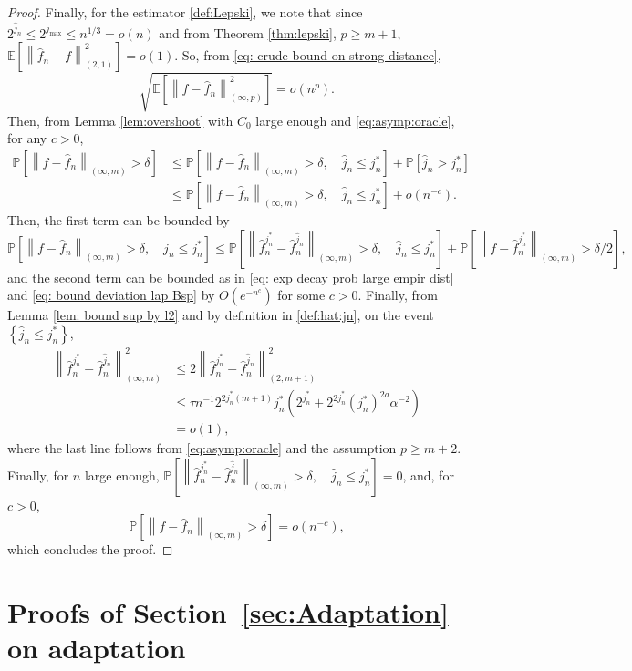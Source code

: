 \documentclass[preprint]{imsart}
\newcommand\norm[1]{\left\lVert#1\right\rVert}
\numberwithin{equation}{section}
\newcounter{cond}
\begin{document}
\begin{appendix}
\begin{proof}
Finally, for the estimator \eqref{def:Lepski}, we note that since $2^{\hat{j}_n}\leq 2^{j_{\max}}\leq n^{1/3}=o(n)$ and from Theorem \ref{thm:lepski}, $p\geq m+1$, $\mathbb{E}\left[\norm{\hat{f}_n-f}_{(2,1)}^2\right]=o(1)$. So, from \eqref{eq: crude bound on strong distance}, 
\[\sqrt{\mathbb{E}\left[\norm{f-\hat{f}_n}_{(\infty,p)}^2\right]}=o(n^{p}).\]
Then, from Lemma \eqref{lem:overshoot} with $C_0$ large enough and \eqref{eq:asymp:oracle}, for any $c>0$,
\begin{align*}
\mathbb{P}\left[\norm{f-\hat{f}_n}_{(\infty,m)}> \delta\right]&\leq \mathbb{P}\left[\norm{f-\hat{f}_n}_{(\infty,m)}> \delta,\quad \hat{j}_n\leq j_n^*\right]+\mathbb{P}\left[\hat{j}_n>j_n^*\right]\\
&\leq \mathbb{P}\left[\norm{f-\hat{f}_n}_{(\infty,m)}> \delta,\quad \hat{j}_n\leq j_n^*\right]+o(n^{-c}).
\end{align*}
Then, the first term can be bounded by
\[\mathbb{P}\left[\norm{f-\hat{f}_n}_{(\infty,m)}> \delta,\quad \hat{j}_n\leq j_n^*\right]\leq \mathbb{P}\left[\norm{\hat{f}_n^{j_n^*}-\hat{f}_n^{\hat{j}_n}}_{(\infty,m)}> \delta,\quad \hat{j}_n\leq j_n^*\right]+\mathbb{P}\left[\norm{f-\hat{f}_n^{j_n^*}}_{(\infty,m)}> \delta/2\right],\]
and the second term can be bounded as in \eqref{eq: exp decay prob large empir dist} and \eqref{eq: bound deviation lap Bsp} by $O(e^{-n^c})$ for some $c>0$. Finally, from Lemma \ref{lem: bound sup by l2} and by definition in \eqref{def:hat:jn}, on the event $\left\{\hat{j}_n\leq j_n^*\right\}$, 
\begin{align*}
    \norm{\hat{f}_n^{j_n^*}-\hat{f}_n^{\hat{j}_n}}_{(\infty,m)}^2&\leq 2\norm{\hat{f}_n^{j_n^*}-\hat{f}_n^{\hat{j}_n}}_{(2,m+1)}^2\\
    &\leq \tau n^{-1} 2^{2j_n^*(m+1)}j_n^*\left(2^{j_n^*}+2^{2j_n^*}(j_n^*)^{2a}\alpha^{-2}\right)\\
    &=o(1),
\end{align*}
where the last line follows from \eqref{eq:asymp:oracle} and the assumption $p\geq m+2$. Finally, for $n$ large enough, $\mathbb{P}\left[\norm{\hat{f}_n^{j_n^*}-\hat{f}_n^{\hat{j}_n}}_{(\infty,m)}> \delta,\quad \hat{j}_n\leq j_n^*\right]=0$, and, for $c>0$,
\[\mathbb{P}\left[\norm{f-\hat{f}_n}_{(\infty,m)}> \delta\right]=o(n^{-c}),\]
which concludes the proof.
\end{proof}


\section{Proofs of Section~\ref{sec:Adaptation} on adaptation}
\label{sec:app:adaptation}



\end{appendix}
\end{document}
